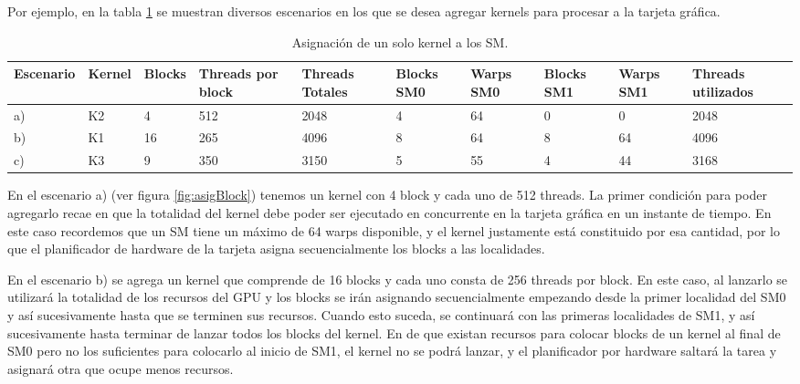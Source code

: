 Por ejemplo, en la tabla \ref{tab:asigUnKernelSM} se muestran diversos escenarios en los que se desea agregar kernels para procesar a la tarjeta gráfica.
\newline

  \begin{table}[h!]
      \begin{center}
            \scriptsize
        \begin{tabular}{|m{1.5cm}|m{1cm}|m{1cm}|m{1.5cm}|m{1.5cm}|m{1cm}|m{1cm}|m{1cm}|m{1cm}|m{1.5cm}|}
         \hline
         \cellcolor{lightgray}\textbf{Escenario} &
         \cellcolor{lightgray}\textbf{Kernel} & 
         \cellcolor{lightgray}\textbf{Blocks} &
         \cellcolor{lightgray}\textbf{Threads por block} &
         \cellcolor{lightgray}\textbf{Threads Totales} &
         \cellcolor{lightgray}\textbf{Blocks SM0} &
         \cellcolor{lightgray}\textbf{Warps SM0} &
         \cellcolor{lightgray}\textbf{Blocks SM1} &
         \cellcolor{lightgray}\textbf{Warps SM1} &
         \cellcolor{lightgray}\textbf{Threads utilizados}\\ 
         \hline
         a) & K2 & 4 & 512 & 2048 & 4 & 64 & 0 & 0 & 2048\\ 
         \hline
         b) & K1 & 16 & 265 & 4096 & 8 & 64 & 8 & 64 & 4096\\ 
         \hline
         c) & K3 & 9 & 350 & 3150 & 5 & 55 & 4 & 44 & 3168\\ 
         \hline
           \end{tabular}
        \caption{Asignación de un solo kernel a los SM.}
        \label{tab:asigUnKernelSM}
      \end{center}
    \end{table}
    
    En el escenario a) (ver figura \ref{fig:asigBlock}) tenemos un kernel con 4 block y cada uno de 512 threads. La primer condición para poder agregarlo recae en que la totalidad del kernel debe poder ser ejecutado en concurrente en la tarjeta gráfica en un instante de tiempo. En este caso recordemos que un SM tiene un máximo de 64 warps disponible, y el kernel justamente está constituido por esa cantidad, por lo que el planificador de hardware de la tarjeta asigna secuencialmente los blocks a las localidades.
    \newline
    
    En el escenario b) se agrega un kernel que comprende de 16 blocks y cada uno consta de 256 threads por block. En este caso, al lanzarlo se utilizará la totalidad de los recursos del GPU y los blocks se irán asignando secuencialmente empezando desde la primer localidad del SM0 y así sucesivamente hasta que se terminen sus recursos. Cuando esto suceda, se continuará con las primeras localidades de SM1, y así sucesivamente hasta terminar de lanzar todos los blocks del kernel. En de que existan recursos para colocar blocks de un kernel al final de SM0 pero no los suficientes para colocarlo al inicio de SM1, el kernel no se podrá lanzar, y el planificador por hardware saltará la tarea y asignará otra que ocupe menos recursos.
    \newline
    
